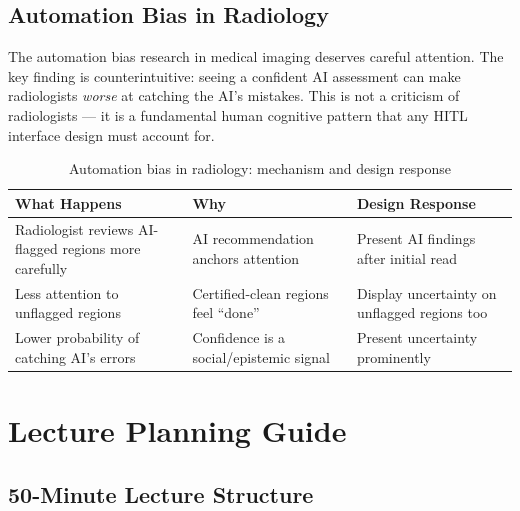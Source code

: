 \subsection{Automation Bias in Radiology}

The automation bias research in medical imaging deserves careful attention. The key finding is counterintuitive: seeing a confident AI assessment can make radiologists \emph{worse} at catching the AI's mistakes. This is not a criticism of radiologists --- it is a fundamental human cognitive pattern that any HITL interface design must account for.

\begin{table}[htbp]
\caption{Automation bias in radiology: mechanism and design response}
\label{tab:rad-automation-bias}
\centering
\begin{tabular}{@{}p{4cm}p{4.5cm}p{4cm}@{}}
\toprule
\textbf{What Happens} & \textbf{Why} & \textbf{Design Response} \\
\midrule
Radiologist reviews AI-flagged regions more carefully & AI recommendation anchors attention & Present AI findings after initial read \\
Less attention to unflagged regions & Certified-clean regions feel ``done'' & Display uncertainty on unflagged regions too \\
Lower probability of catching AI's errors & Confidence is a social/epistemic signal & Present uncertainty prominently \\
\bottomrule
\end{tabular}
\end{table}

\section{Lecture Planning Guide}

\subsection{50-Minute Lecture Structure}

